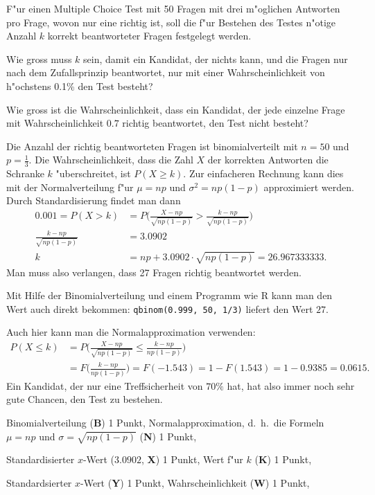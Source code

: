 F"ur einen Multiple Choice Test mit 50 Fragen mit drei m"oglichen Antworten
pro Frage, wovon nur eine richtig ist, soll die f"ur
Bestehen des Testes n"otige Anzahl $k$ korrekt beantworteter Fragen
festgelegt werden.
\begin{teilaufgaben}
\item Wie gross muss $k$ sein, damit ein Kandidat,
der nichts kann, und die Fragen nur nach dem Zufallsprinzip beantwortet,
nur mit einer Wahrscheinlichkeit von h"ochstens 0.1\% den Test besteht?
\item Wie gross ist die Wahrscheinlichkeit, dass ein Kandidat, der jede
einzelne Frage mit Wahrscheinlichkeit $0.7$ richtig beantwortet, den
Test nicht besteht?
\end{teilaufgaben}

\begin{loesung}
\begin{teilaufgaben}
\item Die Anzahl der richtig beantworteten Fragen ist binomialverteilt
mit $n=50$ und $p=\frac13$. Die Wahrscheinlichkeit, dass die Zahl $X$
der korrekten Antworten die Schranke $k$ "uberschreitet, ist $P(X\ge k)$.
Zur einfacheren Rechnung kann dies mit der Normalverteilung f"ur
$\mu = np$ und $\sigma^2=np(1-p)$ approximiert werden. Durch Standardisierung
findet man dann
\begin{align*}
0.001=P(X>k)
&=
P\biggl(
\frac{X-np}{\sqrt{np(1-p)}}>\frac{k-np}{\sqrt{np(1-p)}}
\biggr)
\\
\frac{k-np}{\sqrt{np(1-p)}}&=3.0902
\\
k&= np+3.0902\cdot \sqrt{np(1-p)}
=26.967333333.
\end{align*}
Man muss also verlangen, dass 27 Fragen richtig beantwortet werden.

Mit Hilfe der Binomialverteilung und einem Programm wie R kann man den
Wert auch direkt bekommen:
\texttt{qbinom(0.999, 50, 1/3)}
liefert den Wert $27$.
\item
Auch hier kann man die Normalapproximation verwenden:
\begin{align*}
P(X\le k)&=
P\biggl(
\frac{X-np}{\sqrt{np(1-p)}}\le\frac{k-np}{np(1-p)}
\biggr)
\\
&=F\biggl(
\frac{k-np}{np(1-p)}
\biggr)
=F(-1.543)=1-F(1.543)=1-0.9385=0.0615.
\end{align*}
Ein Kandidat, der nur eine Treffsicherheit von $70\%$ hat, hat also
immer noch sehr gute Chancen, den Test zu bestehen.
\end{teilaufgaben}
\end{loesung}

\begin{bewertung}
Binomialverteilung (\textbf{B}) 1 Punkt,
Normalapproximation, d.~h.~die Formeln $\mu=np$ und $\sigma=\sqrt{np(1-p)}$
(\textbf{N}) 1 Punkt,
\begin{teilaufgaben}
\item
Standardisierter $x$-Wert ($3.0902$, \textbf{X}) 1 Punkt,
Wert f"ur $k$ (\textbf{K}) 1 Punkt,
\item
Standardsierter $x$-Wert (\textbf{Y}) 1 Punkt,
Wahrscheinlichkeit (\textbf{W}) 1 Punkt,
\end{teilaufgaben}
\end{bewertung}

